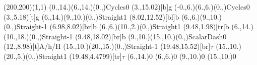 \documentclass[12pt]{article}
\begin{document}
 \thispagestyle{empty}
	
 \begin{feynartspicture}(200,200)(1,1)
 \FADiagram{}
\FAProp(0.,14.)(6.,14.)(0.,){Cycles}{0}
\FALabel(3.,15.02)[b]{g}
\FAProp(-0.,6.)(6.,6.)(0.,){Cycles}{0}
\FALabel(3.,5.18)[t]{g}
\FAProp(6.,14.)(9.,10.)(0.,){Straight}{1}
\FALabel(8.02,12.52)[bl]{b}
\FAProp(6.,6.)(9.,10.)(0.,){Straight}{-1}
\FALabel(6.98,8.02)[br]{b}
\FAProp(6.,6.)(10.,2.)(0.,){Straight}{1}
\FALabel(9.48,1.98)[tr]{b}
\FAProp(6.,14.)(10.,18.)(0.,){Straight}{-1}
\FALabel(9.48,18.02)[br]{b}
\FAProp(9.,10.)(15.,10.)(0.,){ScalarDash}{0}
\FALabel(12.,8.98)[t]{A/h/H}
\FAProp(15.,10.)(20.,15.)(0.,){Straight}{-1}
\FALabel(19.48,15.52)[br]{$\tau$}
\FAProp(15.,10.)(20.,5.)(0.,){Straight}{1}
\FALabel(19.48,4.4799)[tr]{$\tau$}
\FAVert(6.,14.){0}
\FAVert(6.,6.){0}
\FAVert(9.,10.){0}
\FAVert(15.,10.){0}
 \end{feynartspicture} 
\end{document}
